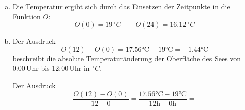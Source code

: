 \begin{exercise}
    \begin{enumerate}[a)]
      \item Die Temperatur ergibt sich durch das
            Einsetzen der Zeitpunkte in die
            Funktion $O$:
            \begin{equation*}
              O(0)=\num{19}\,{}^\circ C
              \qquad
              O(24)=\num{16.12}\,{}^\circ C
            \end{equation*}
      \item Der Ausdruck
            \begin{equation*}
              O(\num{12})-O(\num{0})=\num{17.56}\si{\celsius}-\num{19}\si{\celsius}=-\num{1.44}\si{\celsius}
            \end{equation*}
            beschreibt die absolute Temperaturänderung
            der Oberfläche des Sees von 0:00\,Uhr bis
            12:00\,Uhr in ${}^\circ{C}$.
            \par
            Der Ausdruck
            \begin{equation*}
              \frac{O(\num{12})-O(\num{0})}{\num{12}-\num{0}}=
              \frac{\num{17.56}\si{\celsius}-\num{19}\si{\celsius}}{\num{12}\si{\hour}-\num{0}\si{\hour}}=

\end{equation*}
\end{enumerate}
\end{exercise}
